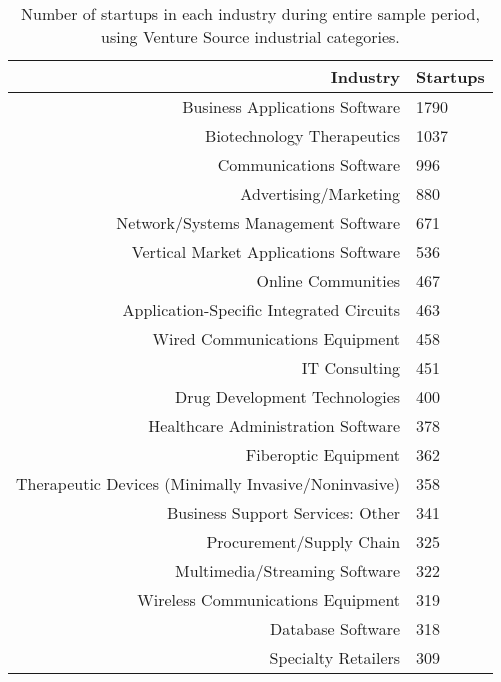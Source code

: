 \begin{table}[!htb]
\centering
\begingroup\small
\begin{tabular}{rl}
  \toprule
Industry & Startups \\ 
  \midrule
Business Applications Software & 1790 \\ 
  Biotechnology Therapeutics & 1037 \\ 
  Communications Software & 996 \\ 
  Advertising/Marketing & 880 \\ 
  Network/Systems Management Software & 671 \\ 
  Vertical Market Applications Software & 536 \\ 
  Online Communities & 467 \\ 
  Application-Specific Integrated Circuits & 463 \\ 
  Wired Communications Equipment & 458 \\ 
  IT Consulting & 451 \\ 
  Drug Development Technologies & 400 \\ 
  Healthcare Administration Software & 378 \\ 
  Fiberoptic Equipment & 362 \\ 
  Therapeutic Devices (Minimally Invasive/Noninvasive) & 358 \\ 
  Business Support Services: Other & 341 \\ 
  Procurement/Supply Chain & 325 \\ 
  Multimedia/Streaming Software & 322 \\ 
  Wireless Communications Equipment & 319 \\ 
  Database Software & 318 \\ 
  Specialty Retailers & 309 \\ 
   \bottomrule
\end{tabular}
\endgroup
\caption{Number of startups in each industry during entire sample period, using Venture Source industrial categories.} 
\end{table}
